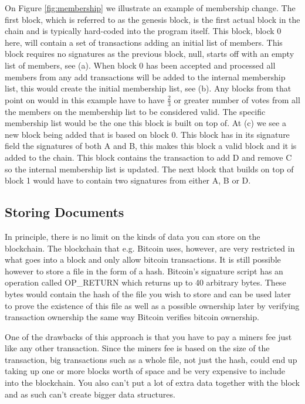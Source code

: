 \documentclass[12pt]{article}
\begin{document}

On Figure \ref{fig:membership} we illustrate an example of membership change. The first block, which is referred to as the genesis block, is the first actual block in the chain and is typically hard-coded into the program itself. This block, block 0 here, will contain a set of transactions adding an initial list of members. This block requires no signatures as the previous block, null, starts off with an empty list of members, see (a). When block 0 has been accepted and processed all members from any add transactions will be added to the internal membership list, this would create the initial membership list, see (b). Any blocks from that point on would in this example have to have $\frac{2}{3}$ or greater number of votes from all the members on the membership list to be considered valid. The specific membership list would be the one this block is built on top of. At (c) we see a new block being added that is based on block 0. This block has in its signature field the signatures of both A and B, this makes this block a valid block and it is added to the chain. This block contains the transaction to add D and remove C so the internal membership list is updated. The next block that builds on top of block 1 would have to contain two signatures from either A, B or D.

\subsection{Storing Documents}

In principle, there is no limit on the kinds of data you can store on the blockchain. The blockchain that e.g. Bitcoin uses, however, are very restricted in what goes into a block and only allow bitcoin transactions. It is still possible however to store a file in the form of a hash. Bitcoin's signature script has an operation called OP\_RETURN which returns up to 40 arbitrary bytes. These bytes would contain the hash of the file you wish to store and can be used later to prove the existence of this file as well as a possible ownership later by verifying transaction ownership the same way Bitcoin verifies bitcoin ownership.

One of the drawbacks of this approach is that you have to pay a miners fee just like any other transaction. Since the miners fee is based on the size of the transaction, big transactions such as a whole file, not just the hash, could end up taking up one or more blocks worth of space and be very expensive to include into the blockchain. You also can't put a lot of extra data together with the block and as such can't create bigger data structures.
\end{document}
